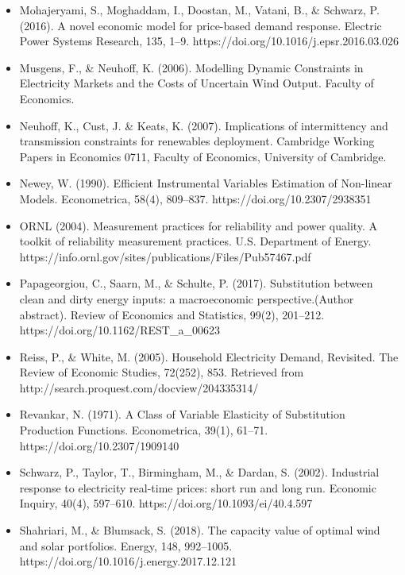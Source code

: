 \documentclass[aspectratio=169]{beamer}
\begin{document}
\begin{frame}[allowframebreaks]
\begin{itemize}
\item Mohajeryami, S., Moghaddam, I., Doostan, M., Vatani, B., \& Schwarz, P. (2016). A novel economic model for price-based demand response. Electric Power Systems Research, 135, 1–9. https://doi.org/10.1016/j.epsr.2016.03.026

\item Musgens, F., \& Neuhoff, K. (2006). Modelling Dynamic Constraints in Electricity Markets and the Costs of Uncertain Wind Output. Faculty of Economics.

\item Neuhoff, K., Cust, J. \& Keats, K. (2007). Implications of intermittency and transmission constraints for renewables deployment. Cambridge Working Papers in Economics 0711, Faculty of Economics, University of Cambridge.

\item Newey, W. (1990). Efficient Instrumental Variables Estimation of Non-linear Models. Econometrica, 58(4), 809–837. https://doi.org/10.2307/2938351

\item ORNL (2004). Measurement practices for reliability and power quality. A toolkit of reliability measurement practices. U.S. Department of Energy. https://info.ornl.gov/sites/publications/Files/Pub57467.pdf

\item Papageorgiou, C., Saarn, M., \& Schulte, P. (2017). Substitution between clean and dirty energy inputs: a macroeconomic perspective.(Author abstract). Review of Economics and Statistics, 99(2), 201–212. https://doi.org/10.1162/REST\_a\_00623

\item Reiss, P., \& White, M. (2005). Household Electricity Demand, Revisited. The Review of Economic Studies, 72(252), 853. Retrieved from http://search.proquest.com/docview/204335314/

\item Revankar, N. (1971). A Class of Variable Elasticity of Substitution Production Functions. Econometrica, 39(1), 61–71. https://doi.org/10.2307/1909140

\item Schwarz, P., Taylor, T., Birmingham, M., \& Dardan, S. (2002). Industrial response to electricity real-time prices: short run and long run. Economic Inquiry, 40(4), 597–610. https://doi.org/10.1093/ei/40.4.597

\item Shahriari, M., \& Blumsack, S. (2018). The capacity value of optimal wind and solar portfolios. Energy, 148, 992–1005. https://doi.org/10.1016/j.energy.2017.12.121


\end{itemize}
\end{frame}
\end{document}
